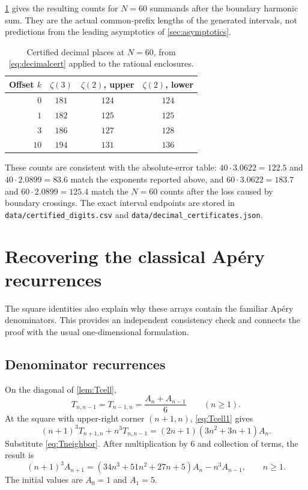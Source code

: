 \documentclass[11pt,letterpaper]{article}
\numberwithin{equation}{section}
\theoremstyle{definition}
\begin{document}
\cref{tab:digits} gives the resulting counts for $N=60$ summands after
the boundary harmonic sum. They are the actual common-prefix lengths of
the generated intervals, not predictions from the leading asymptotics of
\cref{sec:asymptotics}.

\begin{table}[htbp]
\centering
\small
\caption{Certified decimal places at $N=60$, from
\eqref{eq:decimalcert} applied to the rational enclosures.}
\label{tab:digits}
\begin{tabular}{@{}rccc@{}}
\toprule
Offset $k$ & $\zeta(3)$ & $\zeta(2)$, upper & $\zeta(2)$, lower\\
\midrule
$0$  & $181$ & $124$ & $124$\\
$1$  & $182$ & $125$ & $125$\\
$3$  & $186$ & $127$ & $128$\\
$10$ & $194$ & $131$ & $136$\\
\bottomrule
\end{tabular}
\end{table}

These counts are consistent with the absolute-error table: $40\cdot
3.0622=122.5$ and $40\cdot2.0899=83.6$ match the exponents reported
above, and $60\cdot3.0622=183.7$ and $60\cdot2.0899=125.4$ match the
$N=60$ counts after the loss caused by boundary crossings. The exact
interval endpoints are stored in \texttt{data/certified\_digits.csv}
and \texttt{data/decimal\_certificates.json}.

\section{Recovering the classical Ap\'ery recurrences}\label{sec:recurrences}

The square identities also explain why these arrays contain the familiar
Ap\'ery denominators. This provides an independent consistency check and
connects the proof with the usual one-dimensional formulation.

\subsection{Denominator recurrences}

On the diagonal of \cref{lem:Tcell},
\begin{equation}\label{eq:Tneighbor}
 T_{n,n-1}=T_{n-1,n}=\frac{A_n+A_{n-1}}6\qquad(n\geq1).
\end{equation}
At the square with upper-right corner $(n+1,n)$,
\eqref{eq:Tcell1} gives
\[
 (n+1)^3T_{n+1,n}+n^3T_{n,n-1}
 =(2n+1)(3n^2+3n+1)A_n.
\]
Substitute \eqref{eq:Tneighbor}. After multiplication by $6$ and
collection of terms, the result is
\begin{equation}\label{eq:rec3}
 (n+1)^3 A_{n+1}
 =(34n^3+51n^2+27n+5)A_n-n^3A_{n-1},
 \qquad n\geq1.
\end{equation}
The initial values are $A_0=1$ and $A_1=5$.
\end{document}
